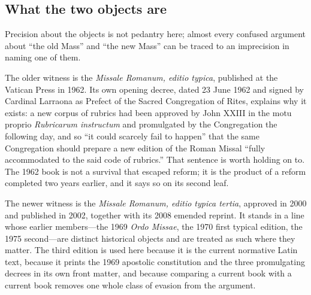 \subsection{What the two objects are}

Precision about the objects is not pedantry here; almost every confused argument about ``the old Mass'' and ``the new Mass'' can be traced to an imprecision in naming one of them.

The older witness is the \emph{Missale Romanum, editio typica}, published at the Vatican Press in 1962. Its own opening decree, dated 23 June 1962 and signed by Cardinal Larraona as Prefect of the Sacred Congregation of Rites, explains why it exists: a new corpus of rubrics had been approved by John XXIII in the motu proprio \emph{Rubricarum instructum} and promulgated by the Congregation the following day, and so ``it could scarcely fail to happen'' that the same Congregation should prepare a new edition of the Roman Missal ``fully accommodated to the said code of rubrics.'' That sentence is worth holding on to. The 1962 book is not a survival that escaped reform; it is the product of a reform completed two years earlier, and it says so on its second leaf.

The newer witness is the \emph{Missale Romanum, editio typica tertia}, approved in 2000 and published in 2002, together with its 2008 emended reprint. It stands in a line whose earlier members---the 1969 \emph{Ordo Missae}, the 1970 first typical edition, the 1975 second---are distinct historical objects and are treated as such where they matter. The third edition is used here because it is the current normative Latin text, because it prints the 1969 apostolic constitution and the three promulgating decrees in its own front matter, and because comparing a current book with a current book removes one whole class of evasion from the argument.

